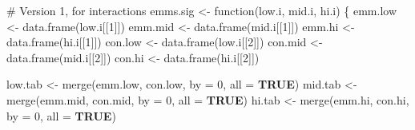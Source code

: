 \documentclass[
  bookmarksnumbered]{article}
\newenvironment{Shaded}{\begin{snugshade}}{\end{snugshade}}
\newcommand{\AttributeTok}[1]{\textcolor[rgb]{0.80,0.80,0.80}{#1}}
\newcommand{\CommentTok}[1]{\textcolor[rgb]{0.50,0.62,0.50}{#1}}
\newcommand{\ConstantTok}[1]{\textcolor[rgb]{0.86,0.64,0.64}{\textbf{#1}}}
\newcommand{\ControlFlowTok}[1]{\textcolor[rgb]{0.94,0.87,0.69}{#1}}
\newcommand{\DecValTok}[1]{\textcolor[rgb]{0.86,0.86,0.80}{#1}}
\newcommand{\FunctionTok}[1]{\textcolor[rgb]{0.94,0.94,0.56}{#1}}
\newcommand{\NormalTok}[1]{\textcolor[rgb]{0.80,0.80,0.80}{#1}}
\newcommand{\OtherTok}[1]{\textcolor[rgb]{0.94,0.94,0.56}{#1}}
\begin{document}
\begin{Shaded}
\begin{Highlighting}[]
\CommentTok{\# Version 1, for interactions}
\NormalTok{emms.sig }\OtherTok{\textless{}{-}} \ControlFlowTok{function}\NormalTok{(low.i, mid.i, hi.i) \{}
\NormalTok{  emm.low }\OtherTok{\textless{}{-}} \FunctionTok{data.frame}\NormalTok{(low.i[[}\DecValTok{1}\NormalTok{]])}
\NormalTok{  emm.mid }\OtherTok{\textless{}{-}} \FunctionTok{data.frame}\NormalTok{(mid.i[[}\DecValTok{1}\NormalTok{]])}
\NormalTok{  emm.hi }\OtherTok{\textless{}{-}} \FunctionTok{data.frame}\NormalTok{(hi.i[[}\DecValTok{1}\NormalTok{]])}
\NormalTok{  con.low }\OtherTok{\textless{}{-}} \FunctionTok{data.frame}\NormalTok{(low.i[[}\DecValTok{2}\NormalTok{]])}
\NormalTok{  con.mid }\OtherTok{\textless{}{-}} \FunctionTok{data.frame}\NormalTok{(mid.i[[}\DecValTok{2}\NormalTok{]])}
\NormalTok{  con.hi }\OtherTok{\textless{}{-}} \FunctionTok{data.frame}\NormalTok{(hi.i[[}\DecValTok{2}\NormalTok{]])}

\NormalTok{  low.tab }\OtherTok{\textless{}{-}} \FunctionTok{merge}\NormalTok{(emm.low, con.low, }\AttributeTok{by =} \DecValTok{0}\NormalTok{, }\AttributeTok{all =} \ConstantTok{TRUE}\NormalTok{)}
\NormalTok{  mid.tab }\OtherTok{\textless{}{-}} \FunctionTok{merge}\NormalTok{(emm.mid, con.mid, }\AttributeTok{by =} \DecValTok{0}\NormalTok{, }\AttributeTok{all =} \ConstantTok{TRUE}\NormalTok{)}
\NormalTok{  hi.tab }\OtherTok{\textless{}{-}} \FunctionTok{merge}\NormalTok{(emm.hi, con.hi, }\AttributeTok{by =} \DecValTok{0}\NormalTok{, }\AttributeTok{all =} \ConstantTok{TRUE}\NormalTok{)}


\end{Highlighting}
\end{Shaded}
\end{document}
